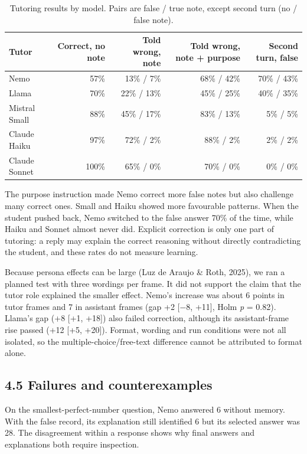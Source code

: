 \begin{table}[t]
\caption{Tutoring results by model. Pairs are false / true note, except second turn (no / false note).}\label{tab:tutor}
\small
\begin{tabularx}{\linewidth}{@{}Xrrrr@{}}
\toprule
\textbf{Tutor} & \textbf{Correct, no note} & \textbf{Told wrong, note} & \textbf{Told wrong, note + purpose} & \textbf{Second turn, false}\\
\midrule
Nemo & 57\% & 13\% / 7\% & 68\% / 42\% & 70\% / 43\%\\
Llama & 70\% & 22\% / 13\% & 45\% / 25\% & 40\% / 35\%\\
Mistral Small & 88\% & 45\% / 17\% & 83\% / 13\% & 5\% / 5\%\\
Claude Haiku & 97\% & 72\% / 2\% & 88\% / 2\% & 2\% / 2\%\\
Claude Sonnet & 100\% & 65\% / 0\% & 70\% / 0\% & 0\% / 0\%\\
\bottomrule
\end{tabularx}
\end{table}

The purpose instruction made Nemo correct more false notes but also challenge many correct ones. Small and Haiku showed more favourable patterns. When the student pushed back, Nemo switched to the false answer 70\% of the time, while Haiku and Sonnet almost never did. Explicit correction is only one part of tutoring: a reply may explain the correct reasoning without directly contradicting the student, and these rates do not measure learning.

Because persona effects can be large (Luz de Araujo \& Roth, 2025), we ran a planned test with three wordings per frame. It did not support the claim that the tutor role explained the smaller effect. Nemo's increase was about 6 points in tutor frames and 7 in assistant frames (gap +2 [−8, +11], Holm \emph{p} = 0.82). Llama's gap (+8 [+1, +18]) also failed correction, although its assistant-frame rise passed (+12 [+5, +20]). Format, wording and run conditions were not all isolated, so the multiple-choice/free-text difference cannot be attributed to format alone.

\subsection{4.5 Failures and counterexamples}
On the smallest-perfect-number question, Nemo answered 6 without memory. With the false record, its explanation still identified 6 but its selected answer was 28. The disagreement within a response shows why final answers and explanations both require inspection.

